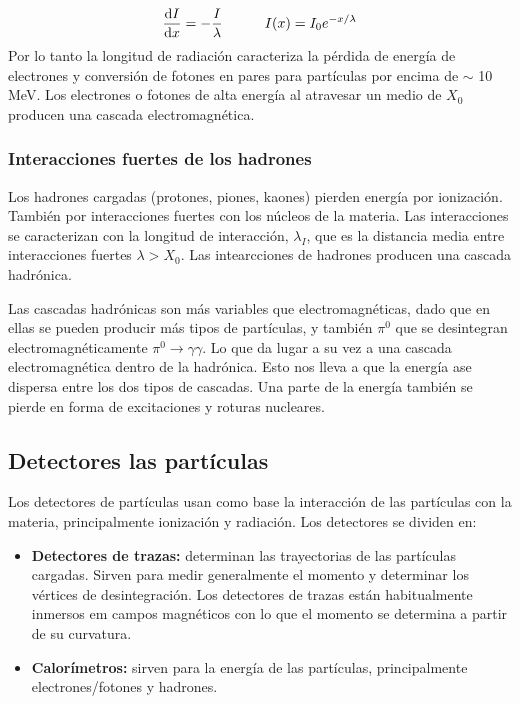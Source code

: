 \begin{equation}
	\frac{\mathrm{d} I}{\mathrm{d} x} = - \frac{I}{\lambda} \quad \quad \quad I(x) = I_0 e^{-x/\lambda}
\end{equation}
Por lo tanto la longitud de radiación caracteriza la pérdida de energía de electrones y conversión de fotones en pares para partículas por encima de $\sim$ 10 MeV. Los electrones o fotones de alta energía al atravesar un medio de $X_0$ producen una cascada electromagnética. 

\subsubsection{Interacciones fuertes de los hadrones}

Los hadrones cargadas (protones, piones, kaones) pierden energía por ionización. También por interacciones fuertes con los núcleos de la materia. Las interacciones se caracterizan con la longitud de interacción, $\lambda_I$, que es la distancia media entre interacciones fuertes $\lambda > X_0$. Las intearcciones de hadrones producen una cascada hadrónica. 

Las cascadas hadrónicas son más variables que electromagnéticas, dado que en ellas se pueden producir más tipos de partículas, y también $\pi^0$ que se desintegran electromagnéticamente $\pi^0 \rightarrow \gamma \gamma$. Lo que da lugar a su vez a una cascada electromagnética dentro de la hadrónica. Esto nos lleva a que la energía ase dispersa entre los dos tipos de cascadas. Una parte de la energía también se pierde en forma de excitaciones y roturas nucleares.

\subsection{Detectores las partículas}

Los detectores de partículas usan como base la interacción de las partículas con la materia, principalmente ionización y radiación. Los detectores se dividen en:

\begin{itemize}
	\item \textbf{Detectores de trazas:} determinan las trayectorias de las partículas cargadas. Sirven para medir generalmente el momento y determinar los vértices de desintegración. Los detectores de trazas están habitualmente inmersos em campos magnéticos con lo que el momento se determina a partir de su curvatura.
	\item \textbf{Calorímetros:} sirven para la energía de las partículas, principalmente electrones/fotones y hadrones.
\end{itemize}


